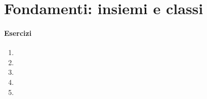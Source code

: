 \chapter{Fondamenti: insiemi e classi}\label{fondamenti}
\subsubsection*{Esercizi}
\begin{enumerate}
 \item
 \item
 \item
 \item
 \item
\end{enumerate}
